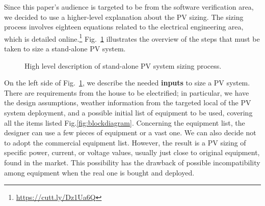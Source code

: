 \documentclass[10pt,journal,compsoc]{IEEEtran}
\begin{document}
Since this paper's audience is targeted to be from the software verification area, we decided to use a higher-level explanation about the PV sizing. The sizing process involves eighteen equations related to the electrical engineering area, which is detailed online.\footnote{\href{https://cutt.ly/Dz1Ua6Q}{https://cutt.ly/Dz1Ua6Q}} Fig.~\ref{fig:flow} illustrates the overview of the steps that must be taken to size a stand-alone PV system.
%
\begin{figure}[h]
\centering
\caption{High level description of stand-alone PV system sizing process.}
\label{fig:flow} 
\end{figure}

On the left side of Fig.~\ref{fig:flow}, we describe the needed \textbf{inputs} to size a PV system. There are requirements from the house to be electrified; in particular, we have the design assumptions, weather information from the targeted local of the PV system deployment, and a possible initial list of equipment to be used, covering all the items listed Fig.\ref{fig:blockdiagram}. Concerning the equipment list, the designer can use a few pieces of equipment or a vast one. We can also decide not to adopt the commercial equipment list. However, the result is a PV sizing of specific power, current, or voltage values, usually just close to original equipment, found in the market. This possibility has the drawback of possible incompatibility among equipment when the real one is bought and deployed.
\end{document}
